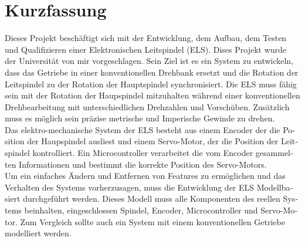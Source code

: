 \chapter*{Kurzfassung}
\label{kurzfassung}
\begin{otherlanguage}{ngerman}
    
Dieses Projekt beschäftigt sich mit der Entwicklung, dem Aufbau, dem Testen und Qualifizieren einer Elektronischen Leitspindel (ELS). Dises Projekt wurde der Universität von mir vorgeschlagen.
Sein Ziel ist es ein System zu entwickeln, dass das Getriebe in einer konventionellen Drehbank ersetzt und die Rotation der Leitspindel zu der Rotation der Hauptspindel synchronisiert. Die ELS muss
fähig sein mit der Rotation der Haupspindel mitzuhalten während einer konventionellen Drehbearbeitung mit unterschiedlichen Drehzahlen und Vorschüben. Zusätzlich muss es möglich sein präzise metrische und
Imperische Gewinde zu drehen.\\

Das elektro-mechanische System der ELS besteht aus einem Encoder der die Position der Haupspindel ausliest und einem Servo-Motor, der die Position der Leitspindel kontrolliert. Ein Microcontroller
verarbeitet die vom Encoder gesammelten Informationen und bestimmt die korrekte Position des Servo-Motors.\\

Um ein einfaches Ändern und Entfernen von Features zu ermöglichen und das Verhalten des Systems vorherzusagen, muss die Entwicklung der ELS Modellbasiert durchgeführt werden. Dieses Modell muss alle
Komponenten des reellen Systems beinhalten, eingeschlossen Spindel, Encoder, Microcontroller und Servo-Motor. Zum Vergleich sollte auch ein System mit einem konventionellen Getriebe modelliert werden.

\end{otherlanguage}
